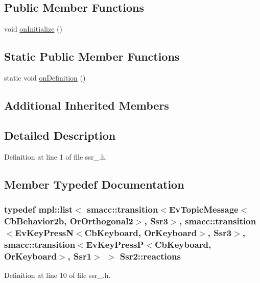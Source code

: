 \subsection*{Public Member Functions}
\begin{DoxyCompactItemize}
\item 
void \hyperlink{structSsr2_a2cf5995600fcc702887dde10aee84902}{on\+Initialize} ()
\end{DoxyCompactItemize}
\subsection*{Static Public Member Functions}
\begin{DoxyCompactItemize}
\item 
static void \hyperlink{structSsr2_ab5924184e178dac57b8f6737bb61cbc6}{on\+Definition} ()
\end{DoxyCompactItemize}
\subsection*{Additional Inherited Members}


\subsection{Detailed Description}


Definition at line 1 of file ssr\+\_.\+h.



\subsection{Member Typedef Documentation}
\subsubsection[{\texorpdfstring{reactions}{reactions}}]{\setlength{\rightskip}{0pt plus 5cm}typedef mpl\+::list$<$ {\bf smacc\+::transition}$<$Ev\+Topic\+Message$<$Cb\+Behavior2b, Or\+Orthogonal2$>$, {\bf Ssr3}$>$, {\bf smacc\+::transition}$<$Ev\+Key\+PressN$<$Cb\+Keyboard, Or\+Keyboard$>$, {\bf Ssr3}$>$, {\bf smacc\+::transition}$<$Ev\+Key\+PressP$<$Cb\+Keyboard, Or\+Keyboard$>$, {\bf Ssr1}$>$ $>$ {\bf Ssr2\+::reactions}}\hypertarget{structSsr2_a5ac97d7f41665b2ec688cb4d3728d82d}{}\label{structSsr2_a5ac97d7f41665b2ec688cb4d3728d82d}


Definition at line 10 of file ssr\+\_.\+h.



